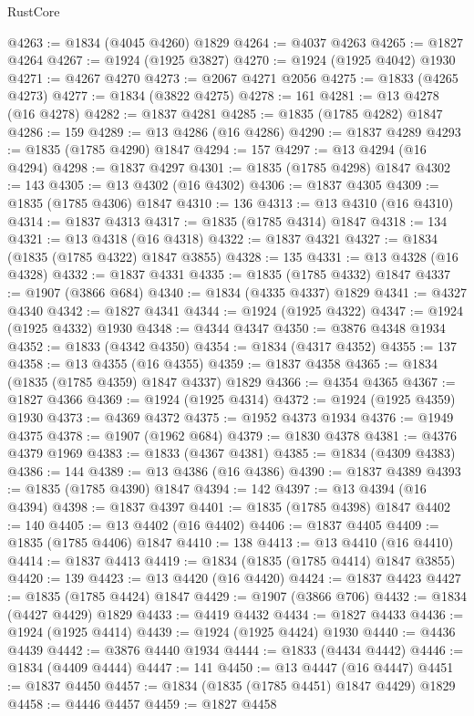 \begin{lexlean}{RustCore}
\begin{coremodule}
@4263 := @1834 (@4045 @4260) @1829
@4264 := @4037 @4263
@4265 := @1827 @4264
@4267 := @1924 (@1925 @3827)
@4270 := @1924 (@1925 @4042) @1930
@4271 := @4267 @4270
@4273 := @2067 @4271 @2056
@4275 := @1833 (@4265 @4273)
@4277 := @1834 (@3822 @4275)
@4278 := 161
@4281 := @13 @4278 (@16 @4278)
@4282 := @1837 @4281
@4285 := @1835 (@1785 @4282) @1847
@4286 := 159
@4289 := @13 @4286 (@16 @4286)
@4290 := @1837 @4289
@4293 := @1835 (@1785 @4290) @1847
@4294 := 157
@4297 := @13 @4294 (@16 @4294)
@4298 := @1837 @4297
@4301 := @1835 (@1785 @4298) @1847
@4302 := 143
@4305 := @13 @4302 (@16 @4302)
@4306 := @1837 @4305
@4309 := @1835 (@1785 @4306) @1847
@4310 := 136
@4313 := @13 @4310 (@16 @4310)
@4314 := @1837 @4313
@4317 := @1835 (@1785 @4314) @1847
@4318 := 134
@4321 := @13 @4318 (@16 @4318)
@4322 := @1837 @4321
@4327 := @1834 (@1835 (@1785 @4322) @1847 @3855)
@4328 := 135
@4331 := @13 @4328 (@16 @4328)
@4332 := @1837 @4331
@4335 := @1835 (@1785 @4332) @1847
@4337 := @1907 (@3866 @684)
@4340 := @1834 (@4335 @4337) @1829
@4341 := @4327 @4340
@4342 := @1827 @4341
@4344 := @1924 (@1925 @4322)
@4347 := @1924 (@1925 @4332) @1930
@4348 := @4344 @4347
@4350 := @3876 @4348 @1934
@4352 := @1833 (@4342 @4350)
@4354 := @1834 (@4317 @4352)
@4355 := 137
@4358 := @13 @4355 (@16 @4355)
@4359 := @1837 @4358
@4365 := @1834 (@1835 (@1785 @4359) @1847 @4337) @1829
@4366 := @4354 @4365
@4367 := @1827 @4366
@4369 := @1924 (@1925 @4314)
@4372 := @1924 (@1925 @4359) @1930
@4373 := @4369 @4372
@4375 := @1952 @4373 @1934
@4376 := @1949 @4375
@4378 := @1907 (@1962 @684)
@4379 := @1830 @4378
@4381 := @4376 @4379 @1969
@4383 := @1833 (@4367 @4381)
@4385 := @1834 (@4309 @4383)
@4386 := 144
@4389 := @13 @4386 (@16 @4386)
@4390 := @1837 @4389
@4393 := @1835 (@1785 @4390) @1847
@4394 := 142
@4397 := @13 @4394 (@16 @4394)
@4398 := @1837 @4397
@4401 := @1835 (@1785 @4398) @1847
@4402 := 140
@4405 := @13 @4402 (@16 @4402)
@4406 := @1837 @4405
@4409 := @1835 (@1785 @4406) @1847
@4410 := 138
@4413 := @13 @4410 (@16 @4410)
@4414 := @1837 @4413
@4419 := @1834 (@1835 (@1785 @4414) @1847 @3855)
@4420 := 139
@4423 := @13 @4420 (@16 @4420)
@4424 := @1837 @4423
@4427 := @1835 (@1785 @4424) @1847
@4429 := @1907 (@3866 @706)
@4432 := @1834 (@4427 @4429) @1829
@4433 := @4419 @4432
@4434 := @1827 @4433
@4436 := @1924 (@1925 @4414)
@4439 := @1924 (@1925 @4424) @1930
@4440 := @4436 @4439
@4442 := @3876 @4440 @1934
@4444 := @1833 (@4434 @4442)
@4446 := @1834 (@4409 @4444)
@4447 := 141
@4450 := @13 @4447 (@16 @4447)
@4451 := @1837 @4450
@4457 := @1834 (@1835 (@1785 @4451) @1847 @4429) @1829
@4458 := @4446 @4457
@4459 := @1827 @4458

\end{coremodule}
\end{lexlean}
